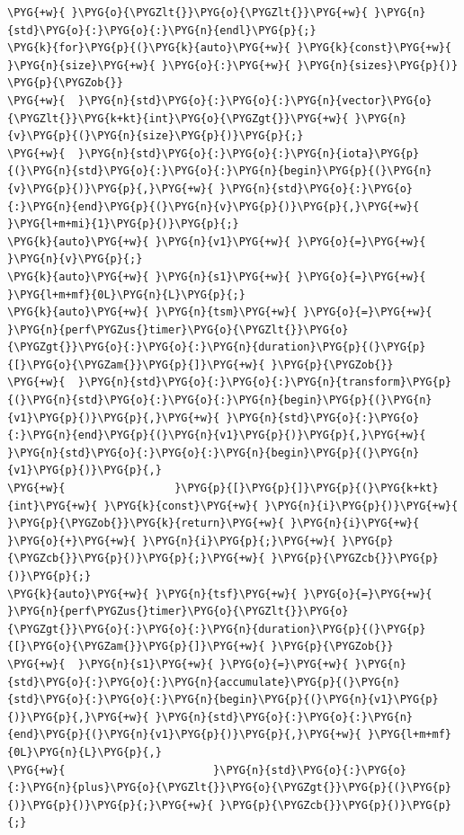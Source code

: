 \begin{codeblockbg}
\begin{Verbatim}[commandchars=\\\{\},breaklines=true,breakanywhere=true,fontsize=\codefont,xleftmargin=17bp]
\PYG{+w}{ }\PYG{o}{\PYGZlt{}}\PYG{o}{\PYGZlt{}}\PYG{+w}{ }\PYG{n}{std}\PYG{o}{:}\PYG{o}{:}\PYG{n}{endl}\PYG{p}{;}
\PYG{k}{for}\PYG{p}{(}\PYG{k}{auto}\PYG{+w}{ }\PYG{k}{const}\PYG{+w}{ }\PYG{n}{size}\PYG{+w}{ }\PYG{o}{:}\PYG{+w}{ }\PYG{n}{sizes}\PYG{p}{)}
\PYG{p}{\PYGZob{}}
\PYG{+w}{  }\PYG{n}{std}\PYG{o}{:}\PYG{o}{:}\PYG{n}{vector}\PYG{o}{\PYGZlt{}}\PYG{k+kt}{int}\PYG{o}{\PYGZgt{}}\PYG{+w}{ }\PYG{n}{v}\PYG{p}{(}\PYG{n}{size}\PYG{p}{)}\PYG{p}{;}
\PYG{+w}{  }\PYG{n}{std}\PYG{o}{:}\PYG{o}{:}\PYG{n}{iota}\PYG{p}{(}\PYG{n}{std}\PYG{o}{:}\PYG{o}{:}\PYG{n}{begin}\PYG{p}{(}\PYG{n}{v}\PYG{p}{)}\PYG{p}{,}\PYG{+w}{ }\PYG{n}{std}\PYG{o}{:}\PYG{o}{:}\PYG{n}{end}\PYG{p}{(}\PYG{n}{v}\PYG{p}{)}\PYG{p}{,}\PYG{+w}{ }\PYG{l+m+mi}{1}\PYG{p}{)}\PYG{p}{;}
\PYG{k}{auto}\PYG{+w}{ }\PYG{n}{v1}\PYG{+w}{ }\PYG{o}{=}\PYG{+w}{ }\PYG{n}{v}\PYG{p}{;}
\PYG{k}{auto}\PYG{+w}{ }\PYG{n}{s1}\PYG{+w}{ }\PYG{o}{=}\PYG{+w}{ }\PYG{l+m+mf}{0L}\PYG{n}{L}\PYG{p}{;}
\PYG{k}{auto}\PYG{+w}{ }\PYG{n}{tsm}\PYG{+w}{ }\PYG{o}{=}\PYG{+w}{ }\PYG{n}{perf\PYGZus{}timer}\PYG{o}{\PYGZlt{}}\PYG{o}{\PYGZgt{}}\PYG{o}{:}\PYG{o}{:}\PYG{n}{duration}\PYG{p}{(}\PYG{p}{[}\PYG{o}{\PYGZam{}}\PYG{p}{]}\PYG{+w}{ }\PYG{p}{\PYGZob{}}
\PYG{+w}{  }\PYG{n}{std}\PYG{o}{:}\PYG{o}{:}\PYG{n}{transform}\PYG{p}{(}\PYG{n}{std}\PYG{o}{:}\PYG{o}{:}\PYG{n}{begin}\PYG{p}{(}\PYG{n}{v1}\PYG{p}{)}\PYG{p}{,}\PYG{+w}{ }\PYG{n}{std}\PYG{o}{:}\PYG{o}{:}\PYG{n}{end}\PYG{p}{(}\PYG{n}{v1}\PYG{p}{)}\PYG{p}{,}\PYG{+w}{ }\PYG{n}{std}\PYG{o}{:}\PYG{o}{:}\PYG{n}{begin}\PYG{p}{(}\PYG{n}{v1}\PYG{p}{)}\PYG{p}{,}
\PYG{+w}{                 }\PYG{p}{[}\PYG{p}{]}\PYG{p}{(}\PYG{k+kt}{int}\PYG{+w}{ }\PYG{k}{const}\PYG{+w}{ }\PYG{n}{i}\PYG{p}{)}\PYG{+w}{ }\PYG{p}{\PYGZob{}}\PYG{k}{return}\PYG{+w}{ }\PYG{n}{i}\PYG{+w}{ }\PYG{o}{+}\PYG{+w}{ }\PYG{n}{i}\PYG{p}{;}\PYG{+w}{ }\PYG{p}{\PYGZcb{}}\PYG{p}{)}\PYG{p}{;}\PYG{+w}{ }\PYG{p}{\PYGZcb{}}\PYG{p}{)}\PYG{p}{;}
\PYG{k}{auto}\PYG{+w}{ }\PYG{n}{tsf}\PYG{+w}{ }\PYG{o}{=}\PYG{+w}{ }\PYG{n}{perf\PYGZus{}timer}\PYG{o}{\PYGZlt{}}\PYG{o}{\PYGZgt{}}\PYG{o}{:}\PYG{o}{:}\PYG{n}{duration}\PYG{p}{(}\PYG{p}{[}\PYG{o}{\PYGZam{}}\PYG{p}{]}\PYG{+w}{ }\PYG{p}{\PYGZob{}}
\PYG{+w}{  }\PYG{n}{s1}\PYG{+w}{ }\PYG{o}{=}\PYG{+w}{ }\PYG{n}{std}\PYG{o}{:}\PYG{o}{:}\PYG{n}{accumulate}\PYG{p}{(}\PYG{n}{std}\PYG{o}{:}\PYG{o}{:}\PYG{n}{begin}\PYG{p}{(}\PYG{n}{v1}\PYG{p}{)}\PYG{p}{,}\PYG{+w}{ }\PYG{n}{std}\PYG{o}{:}\PYG{o}{:}\PYG{n}{end}\PYG{p}{(}\PYG{n}{v1}\PYG{p}{)}\PYG{p}{,}\PYG{+w}{ }\PYG{l+m+mf}{0L}\PYG{n}{L}\PYG{p}{,}
\PYG{+w}{                       }\PYG{n}{std}\PYG{o}{:}\PYG{o}{:}\PYG{n}{plus}\PYG{o}{\PYGZlt{}}\PYG{o}{\PYGZgt{}}\PYG{p}{(}\PYG{p}{)}\PYG{p}{)}\PYG{p}{;}\PYG{+w}{ }\PYG{p}{\PYGZcb{}}\PYG{p}{)}\PYG{p}{;}

\end{Verbatim}
\end{codeblockbg}

